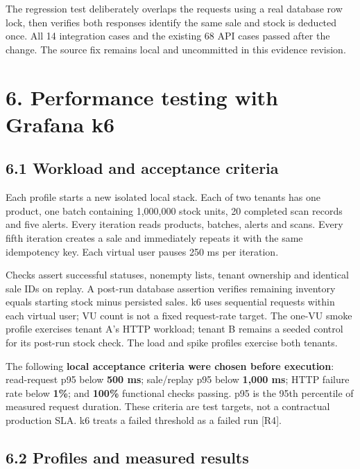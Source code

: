 \documentclass[
  11pt,
]{article}
\newcounter{none} %
\begin{document}
The regression test deliberately overlaps the requests using a real
database row lock, then verifies both responses identify the same sale
and stock is deducted once. All 14 integration cases and the existing 68
API cases passed after the change. The source fix remains local and
uncommitted in this evidence revision.

\section{6. Performance testing with Grafana
k6}\label{performance-testing-with-grafana-k6}

\subsection{6.1 Workload and acceptance
criteria}\label{workload-and-acceptance-criteria}

Each profile starts a new isolated local stack. Each of two tenants has
one product, one batch containing 1,000,000 stock units, 20 completed
scan records and five alerts. Every iteration reads products, batches,
alerts and scans. Every fifth iteration creates a sale and immediately
repeats it with the same idempotency key. Each virtual user pauses 250
ms per iteration.

Checks assert successful statuses, nonempty lists, tenant ownership and
identical sale IDs on replay. A post-run database assertion verifies
remaining inventory equals starting stock minus persisted sales. k6 uses
sequential requests within each virtual user; VU count is not a fixed
request-rate target. The one-VU smoke profile exercises tenant A's HTTP
workload; tenant B remains a seeded control for its post-run stock
check. The load and spike profiles exercise both tenants.

The following \textbf{local acceptance criteria were chosen before
execution}: read-request p95 below \textbf{500 ms}; sale/replay p95
below \textbf{1,000 ms}; HTTP failure rate below \textbf{1\%}; and
\textbf{100\%} functional checks passing. p95 is the 95th percentile of
measured request duration. These criteria are test targets, not a
contractual production SLA. k6 treats a failed threshold as a failed run
{[}R4{]}.

\subsection{6.2 Profiles and measured
results}\label{profiles-and-measured-results}
\end{document}
